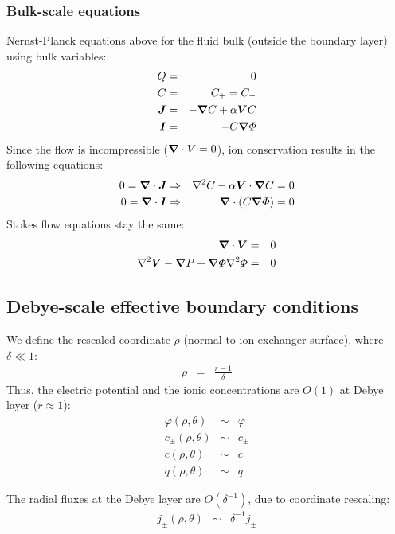 \subsubsection  {Bulk-scale equations}
Nernst-Planck equations above for the fluid bulk (outside
the boundary layer) using bulk variables:
\begin{eqnarray}
 \nonumber Q & = & 0 \\
 \nonumber C & = & C_+ = C_- \\
\boldsymbol{J} &=& -\boldsymbol{\nabla} C + \alpha \boldsymbol{V} C \\
\boldsymbol{I} &=& -C \boldsymbol{\nabla} \varPhi
\end{eqnarray}
Since the flow is incompressible ($\boldsymbol{\nabla} \cdot V = 0$), 
ion conservation results in the following equations:
\begin{eqnarray}
0 = \boldsymbol{\nabla} \cdot \boldsymbol{J} &\Rightarrow& \nabla^2 C - \alpha \boldsymbol{V} \cdot \boldsymbol{\nabla} C = 0 \\
0 = \boldsymbol{\nabla} \cdot \boldsymbol{I} &\Rightarrow& \boldsymbol{\nabla} \cdot \left( C \boldsymbol{\nabla} \varPhi \right) = 0
\end{eqnarray}
Stokes flow equations stay the same:
\begin{eqnarray}
\boldsymbol{\nabla} \cdot \boldsymbol{V} &=& 0 \\
\nabla^2 \boldsymbol{V} - \boldsymbol{\nabla} P + \boldsymbol{\nabla} \varPhi \nabla^2 \varPhi &=& 0
\end{eqnarray}

\subsection{Debye-scale effective boundary conditions}
We define the rescaled coordinate $\rho$ (normal to ion-exchanger surface), where $\delta \ll 1$:
\begin{eqnarray}
 \nonumber \rho &=& \frac{r-1}{\delta} 
\end{eqnarray}
Thus, the electric potential and the ionic concentrations are $O(1)$ at Debye layer ($r \approx 1$):
\begin{eqnarray}
 \nonumber \varphi(\rho,\theta) &\sim& \varphi \\
 \nonumber c_\pm(\rho,\theta) &\sim& c_\pm \\
 \nonumber c(\rho,\theta) &\sim& c \\
 \nonumber q(\rho,\theta) &\sim& q
\end{eqnarray}

The radial fluxes at the Debye layer are $O(\delta^{-1})$, due to coordinate rescaling:
\begin{eqnarray}
 \nonumber j_\pm(\rho, \theta) &\sim& \delta^{-1} j_\pm
\end{eqnarray}

